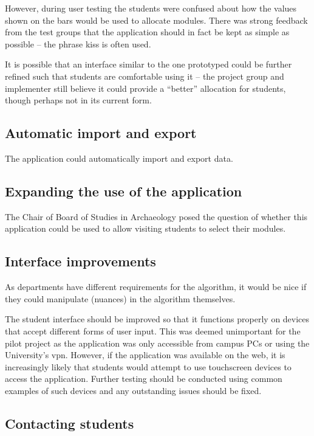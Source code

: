 \documentclass[draft]{scrartcl}
\begin{document}
However, during user testing the students were confused about how the values
shown on the bars would be used to allocate modules. There was strong feedback
from the test groups that the application should in fact be kept as simple as
possible -- the phrase \gls{kiss} is often used.

It is possible that an interface similar to the one prototyped could be
further refined such that students are comfortable using it -- the project
group and implementer still believe it could provide a ``better'' allocation
for students, though perhaps not in its current form.

\subsection{Automatic import and export}
\label{sec:autoexport}

The application could automatically import and export data.

\subsection{Expanding the use of the application}

The Chair of Board of Studies in Archaeology posed the question of whether
this application could be used to allow visiting students to select their
modules.

\subsection{Interface improvements}

As departments have different requirements for the algorithm, it would be nice
if they could manipulate (nuances) in the algorithm themselves.

The student interface should be improved so that it functions properly on
devices that accept different forms of user input. This was deemed unimportant
for the pilot project as the application was only accessible from campus PCs
or using the University's \gls{vpn}. However, if the application was available
on the web, it is increasingly likely that students would attempt to use
touchscreen devices to access the application. Further testing should be
conducted using common examples of such devices and any outstanding issues
should be fixed.

\subsection{Contacting students}
\end{document}
